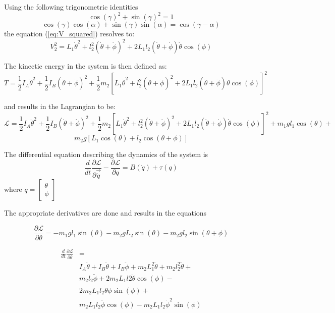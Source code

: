 Using the following trigonometric identities $$ \cos(\gamma)^2 + \sin(\gamma)^2 = 1 $$ 
$$ \cos(\gamma)\cos(\alpha)+\sin(\gamma)\sin(\alpha) = \cos(\gamma - \alpha) $$ the equation (\ref{eq:V_squared}) resolves to: $$ V_{2}^2 = L_{1}\dot{\theta}^2+l_{2}^2(\dot{\theta}+\dot{\phi})^2 + 
2L_{1}l_{2}(\dot{\theta}+\dot{\phi})\dot{\theta}\cos(\phi)$$

The kinectic energy in the system is then defined as:
$$ T = \frac{1}{2}I_{A}\dot{\theta}^2 + \frac{1}{2}I_{B}(\dot{\theta}+\dot{\phi})^2 + \frac{1}{2}m_{2}[L_{1}\dot{\theta}^2+l_{2}^2(\dot{\theta}+\dot{\phi})^2 + 
2L_{1}l_{2}(\dot{\theta}+\dot{\phi})\dot{\theta}\cos(\phi)]^2$$


and results in the Lagrangian to be:
$$\mathcal{L} = \frac{1}{2}I_{A}\dot{\theta}^2 + \frac{1}{2}I_{B}(\dot{\theta}+\dot{\phi})^2 + \frac{1}{2}m_{2}[L_{1}\dot{\theta}^2+l_{2}^2(\dot{\theta}+\dot{\phi})^2 + 
2L_{1}l_{2}(\dot{\theta}+\dot{\phi})\dot{\theta}\cos(\phi)]^2+m_{1}gl_{1}\cos(\theta)+$$
$$m_{2}g[L_{1}\cos(\theta)+l_{2}\cos(\theta+\phi)]$$

The differential equation describing the dynamics of the system is
$$\frac{d}{dt}\frac{\partial\mathcal{L}}{\partial\vec{\dot{q}}}-\frac{\partial\mathcal{L}}{\partial q} = B(\dot{q})+\tau(q)$$ 
where  $ q = 
\begin{bmatrix}
\theta \\
\phi
\end{bmatrix}
$

The appropriate derivatives are done and results in the equations 

\begin{equation}
\frac{\partial\mathcal{L}}{\partial\theta} = -m_{1}gl_{1}\sin(\theta)-m_{2}gL_{2}\sin(\theta)-m_{2}gl_{2}\sin(\theta+\phi)
\end{equation}

\begin{equation}
\begin{split}
\frac{d}{dt}\frac{\partial\mathcal{L}}{\partial\dot{\theta}} &=\\ &I_{A}\ddot{\theta}+I_{B}\ddot{\theta}+I_{B}\ddot{\phi}+m_{2}L_{1}^2\ddot{\theta}+m_{2}l_{2}^2\ddot{\theta}+\\
&m_{2}l_{2}\ddot{\phi}+2m_{2}L_{1}l{2}\ddot{\theta}\cos(\phi)-\\
&2m_{2}L_{1}l_{2}\dot{\theta}\dot{\phi}\sin(\phi)+\\
&m_{2}L_{1}l_{2}\ddot{\phi}\cos(\phi)-m_{2}L_{1}l_{2}\dot{\phi}^2\sin(\phi)
\end{split}
\end{equation}


